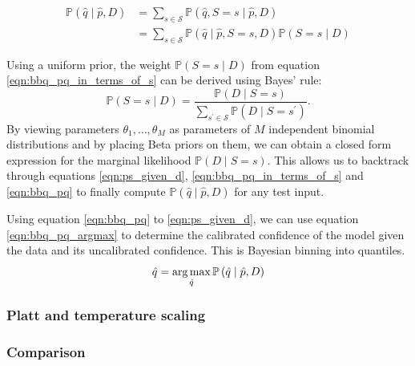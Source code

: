 \begin{align}
\label{eqn:bbq_pq}
\mathbb{P}\left(\hat{q} \mid \hat{p}, D\right) &= \sum_{s \in \mathcal{S}} \mathbb{P}\left(\hat{q}, S=s \mid \hat{p}, D\right) \\
\label{eqn:bbq_pq_in_terms_of_s}
&= \sum_{s \in \mathcal{S}} \mathbb{P}\left(\hat{q} \mid \hat{p}, S=s, D\right) \mathbb{P}(S=s \mid D)
\end{align}

Using a uniform prior, the weight $\mathbb{P}(S=s \mid D)$ from equation \ref{eqn:bbq_pq_in_terms_of_s} can be derived using Bayes' rule:
\begin{equation}
\label{eqn:ps_given_d}
\mathbb{P}(S=s \mid D)=\frac{\mathbb{P}(D \mid S=s)}{\sum_{s^{\prime} \in \mathcal{S}} \mathbb{P}\left(D \mid S=s^{\prime}\right)}.
\end{equation}
By viewing parameters $\theta_{1}, \ldots, \theta_{M}$ as parameters of $M$ independent binomial distributions and by placing Beta priors on them, we can obtain a closed form expression for the marginal likelihood $\mathbb{P}(D \mid S=s)$. This allows us to backtrack through equations \ref{eqn:ps_given_d}, \ref{eqn:bbq_pq_in_terms_of_s} and \ref{eqn:bbq_pq} to finally compute $\mathbb{P}\left(\hat{q} \mid \hat{p}, D\right)$ for any test input.

Using equation \ref{eqn:bbq_pq} to \ref{eqn:ps_given_d}, we can use equation \ref{eqn:bbq_pq_argmax} to determine the calibrated confidence of the model given the data and its uncalibrated confidence. This is Bayesian binning into quantiles.
\begin{equation}
\label{eqn:bbq_pq_argmax}
\hat{q} = \operatorname*{arg\,max}_{\hat{q}} \mathbb{P}\left(\hat{q} \mid \hat{p}, D\right)
\end{equation}

\subsubsection{Platt and temperature scaling}
\subsubsection{Comparison}
  
